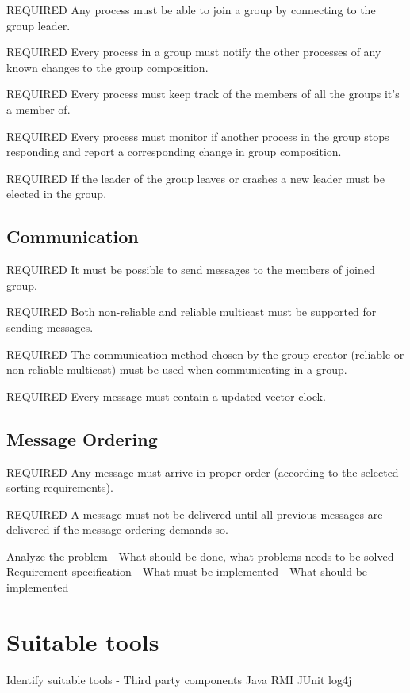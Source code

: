 \documentclass[11pt,swedish]{article}
\begin{document}
REQUIRED Any process must be able to join a group by connecting to the group leader.

REQUIRED Every process in a group must notify the other processes of any known changes to the group composition.

REQUIRED Every process must keep track of the members of all the groups it's a member of.

REQUIRED Every process must monitor if another process in the group stops responding and report a corresponding change in group composition.

REQUIRED If the leader of the group leaves or crashes a new leader must be elected in the group.



\subsection{Communication}
REQUIRED It must be possible to send messages to the members of joined group.

REQUIRED Both non-reliable and reliable multicast must be supported for sending messages.

REQUIRED The communication method chosen by the group creator (reliable or non-reliable multicast) must be used when communicating in a group.

REQUIRED Every message must contain a updated vector clock.



\subsection{Message Ordering}
REQUIRED Any message must arrive in proper order (according to the selected sorting requirements).

REQUIRED A message must not be delivered until all previous messages are delivered if the message ordering demands so.


Analyze the problem
- What should be done, what problems needs to be solved
- Requirement specification
- What must be implemented
- What should be implemented

\section{Suitable tools}
Identify suitable tools
- Third party components
	Java RMI
	JUnit
	log4j

\end{document}
